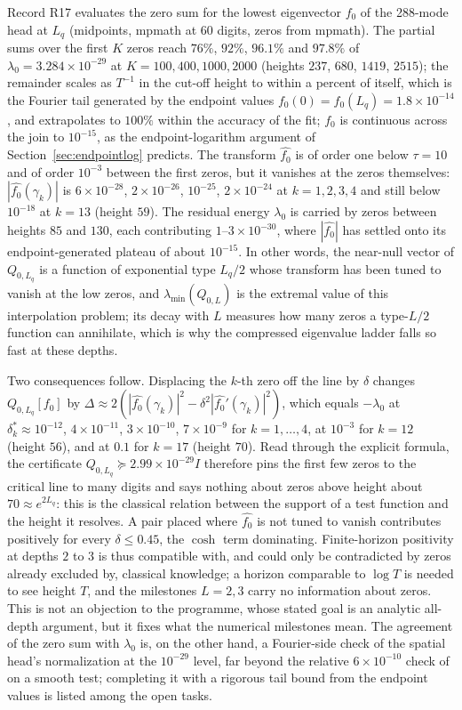 \documentclass[11pt]{article}
\numberwithin{equation}{section}
\theoremstyle{definition}
\theoremstyle{remark}
\newcommand{\Lq}{L_q}
\begin{document}
Record R17 evaluates the zero sum for the lowest eigenvector $f_0$ of the 288-mode head at $\Lq$ (midpoints, mpmath at 60 digits, zeros from mpmath). The partial sums over the first $K$ zeros reach $76\%$, $92\%$, $96.1\%$ and $97.8\%$ of $\lambda_0=3.284\times10^{-29}$ at $K=100,400,1000,2000$ (heights $237$, $680$, $1419$, $2515$); the remainder scales as $T^{-1}$ in the cut-off height to within a percent of itself, which is the Fourier tail generated by the endpoint values $f_0(0)=f_0(\Lq)=1.8\times10^{-14}$, and extrapolates to $100\%$ within the accuracy of the fit; $f_0$ is continuous across the join to $10^{-15}$, as the endpoint-logarithm argument of Section~\ref{sec:endpointlog} predicts. The transform $\widehat{f_0}$ is of order one below $\tau=10$ and of order $10^{-3}$ between the first zeros, but it vanishes at the zeros themselves: $|\widehat{f_0}(\gamma_k)|$ is $6\times10^{-28}$, $2\times10^{-26}$, $10^{-25}$, $2\times10^{-24}$ at $k=1,2,3,4$ and still below $10^{-18}$ at $k=13$ (height $59$). The residual energy $\lambda_0$ is carried by zeros between heights $85$ and $130$, each contributing $1$--$3\times10^{-30}$, where $|\widehat{f_0}|$ has settled onto its endpoint-generated plateau of about $10^{-15}$. In other words, the near-null vector of $Q_{0,\Lq}$ is a function of exponential type $\Lq/2$ whose transform has been tuned to vanish at the low zeros, and $\lambda_{\min}(Q_{0,L})$ is the extremal value of this interpolation problem; its decay with $L$ measures how many zeros a type-$L/2$ function can annihilate, which is why the compressed eigenvalue ladder falls so fast at these depths.

Two consequences follow. Displacing the $k$-th zero off the line by $\delta$ changes $Q_{0,\Lq}[f_0]$ by $\Delta\approx2(|\widehat{f_0}(\gamma_k)|^2-\delta^2|\widehat{f_0}{}'(\gamma_k)|^2)$, which equals $-\lambda_0$ at $\delta^*_k\approx10^{-12}$, $4\times10^{-11}$, $3\times10^{-10}$, $7\times10^{-9}$ for $k=1,\dots,4$, at $10^{-3}$ for $k=12$ (height $56$), and at $0.1$ for $k=17$ (height $70$). Read through the explicit formula, the certificate $Q_{0,\Lq}\succeq2.99\times10^{-29}I$ therefore pins the first few zeros to the critical line to many digits and says nothing about zeros above height about $70\approx e^{2\Lq}$: this is the classical relation between the support of a test function and the height it resolves. A pair placed where $\widehat{f_0}$ is not tuned to vanish contributes positively for every $\delta\le0.45$, the $\cosh$ term dominating. Finite-horizon positivity at depths $2$ to $3$ is thus compatible with, and could only be contradicted by zeros already excluded by, classical knowledge; a horizon comparable to $\log T$ is needed to see height $T$, and the milestones $L=2,3$ carry no information about zeros. This is not an objection to the programme, whose stated goal is an analytic all-depth argument, but it fixes what the numerical milestones mean. The agreement of the zero sum with $\lambda_0$ is, on the other hand, a Fourier-side check of the spatial head's normalization at the $10^{-29}$ level, far beyond the relative $6\times10^{-10}$ check of \cite{WeilDepth} on a smooth test; completing it with a rigorous tail bound from the endpoint values is listed among the open tasks.
\end{document}
